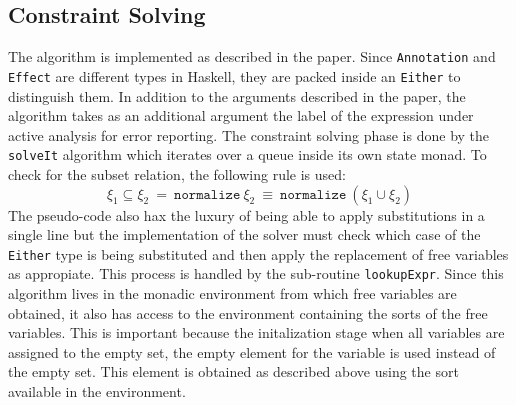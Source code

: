 \documentclass[8pt]{extarticle}
\begin{document}
\subsection{Constraint Solving}
The algorithm is implemented as described in the paper. Since \verb+Annotation+ and \verb+Effect+ are different types in Haskell, they are packed inside an \verb+Either+ to distinguish them. In addition to the arguments described in the paper, the algorithm takes as an additional argument the label of the expression under active analysis for error reporting. The constraint solving phase is done by the \verb+solveIt+ algorithm which iterates over a queue inside its own state monad. To check for the subset relation, the following rule is used:
\[
\xi_1\subseteq \xi_2\ =\ \mathtt{normalize}\ \xi_2\ \equiv\ \mathtt{normalize}\ \left(\xi_1\cup\xi_2\right)
\]
The pseudo-code also hax the luxury of being able to apply substitutions in a single line but the implementation of the solver must check which case of the \verb+Either+ type is being substituted and then apply the replacement of free variables as appropiate. This process is handled by the sub-routine \verb+lookupExpr+. Since this algorithm lives in the monadic environment from which free variables are obtained, it also has access to the environment containing the sorts of the free variables. This is important because the initalization stage when all variables are assigned to the empty set, the empty element for the variable is used instead of the empty set. This element is obtained as described above using the sort available in the environment.
\end{document}
